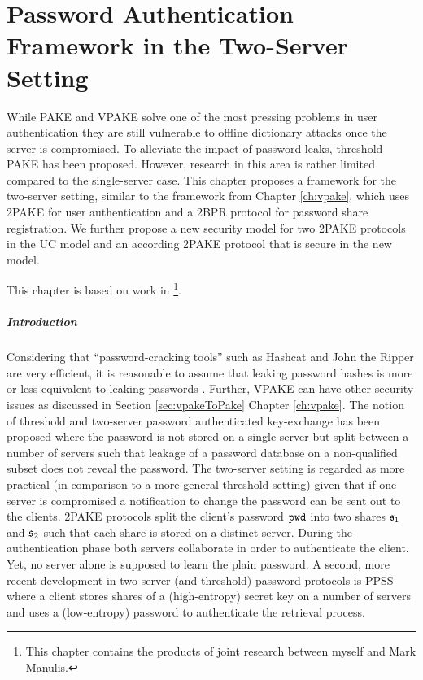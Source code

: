 \chapter{Password Authentication Framework in the Two-Server Setting} \label{ch:2pake}

While \ac{PAKE} and \ac{VPAKE} solve one of the most pressing problems in user authentication they are still vulnerable to offline dictionary attacks once the server is compromised.
To alleviate the impact of password leaks, threshold \ac{PAKE} has been proposed.
However, research in this area is rather limited compared to the single-server case.
This chapter proposes a framework for the two-server setting, similar to the framework from Chapter \ref{ch:vpake}, which uses \ac{2PAKE} for user authentication and a \ac{2BPR} protocol for password share registration.
We further propose a new security model for two \ac{2PAKE} protocols in the \ac{UC} model and an according \ac{2PAKE} protocol that is secure in the new model.

\smallskip
\noindent
This chapter is based on work in \cite{KieferM14b,KieferM15c}\footnote{This chapter contains the products of joint research between 
myself and Mark Manulis.}.

\paragraph{Introduction}

Considering that ``password-cracking tools'' such as Hashcat \cite{hashcat} and John the Ripper \cite{JohnTheRipper} are very efficient, it is reasonable to assume that leaking password hashes is more or less equivalent to leaking passwords \cite{NarayananS05a,WeirAMG09,DellAmicoMR10,Bonneau12}.
Further, \ac{VPAKE} can have other security issues as discussed in Section \ref{sec:vpakeToPake} Chapter \ref{ch:vpake}.
The notion of threshold and two-server password authenticated key-exchange \cite{FordK00,MacKenzieSJ02} has been proposed where the password is not stored on a single server but split between a number of servers such that leakage of a password database on a non-qualified subset does not reveal the password.
The two-server setting is regarded as more practical (in comparison to a more general threshold setting) given that if one server is compromised a notification to change the password can be sent out to the clients.
\ac{2PAKE} protocols \cite{BrainardJKS03,SzydloK05,Katz2012a} split the client's password $\mathtt{pwd}$ into two shares $\mathfrak{s}_1$ and $\mathfrak{s}_2$ such that each share is stored on a distinct server.
During the authentication phase both servers collaborate in order to authenticate the client.
Yet, no server alone is supposed to learn the plain password.
A second, more recent development in two-server (and threshold) password protocols is \ac{PPSS} \cite{Bagherzandi2011,Camenisch2012,JareckiKK14} where a client stores shares of a (high-entropy) secret key on a number of servers and uses a (low-entropy) password to authenticate the retrieval process.

